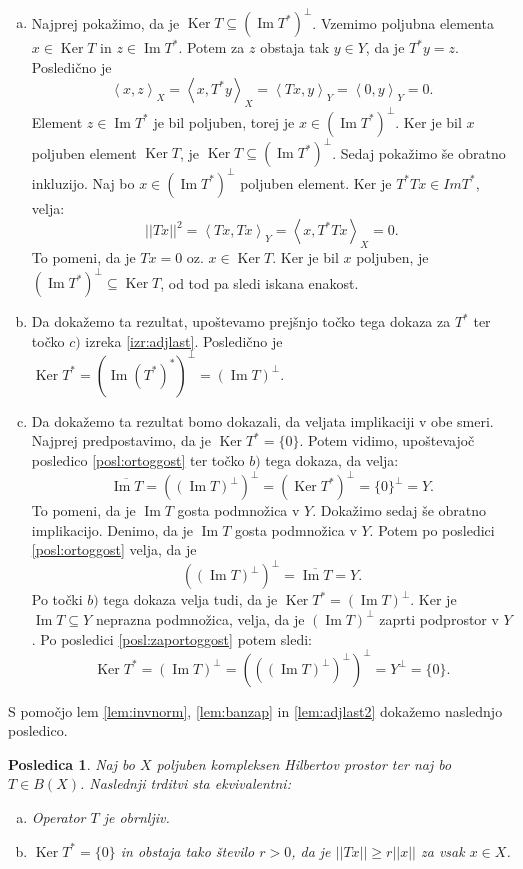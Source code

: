 \documentclass[12pt,a4paper,oneside,fleqn,openany]{book}
\newtheorem{posledica}[izrek]{Posledica}
\newcommand{\eopf}{\raisebox{0.8ex}{\framebox{}}} %
\newenvironment{dokaz}%
{\noindent{\bf Dokaz.}\ }%
{\hfill\eopf\par\bigskip}%
\newcommand{\abs}[1]{\ensuremath{\lvert #1 \rvert}}
\newcommand{\norm}[1]{\abs{\abs{#1}}}
\newcommand{\Sp}[2]{\ensuremath{\left<#1, #2\right>}}
\begin{document}
\begin{dokaz}
	\begin{enumerate}[a)]
		\item Najprej pokažimo, da je $\operatorname{Ker}T \subseteq (\operatorname{Im}T^*)^\bot$. Vzemimo poljubna elementa $x\in \operatorname{Ker}T$ in $z\in \operatorname{Im}T^*$. Potem za $z$ obstaja tak $y\in Y$, da je $T^*y = z$. Posledično je $$\Sp{x}{z}_X = \Sp{x}{T^*y}_X = \Sp{Tx}{y}_Y = \Sp{0}{y}_Y = 0.$$
		Element $z\in\operatorname{Im}T^*$ je bil poljuben, torej je $x\in (\operatorname{Im}T^*)^\bot$. Ker je bil $x$ poljuben element $\operatorname{Ker}T$, je $\operatorname{Ker}T \subseteq (\operatorname{Im}T^*)^\bot$.
		Sedaj pokažimo še obratno inkluzijo. Naj bo $x\in (\operatorname{Im}T^*)^\bot$ poljuben element. Ker je $T^*Tx \in ImT^*$, velja: $$\norm{Tx}^2 = \Sp{Tx}{Tx}_Y = \Sp{x}{T^*Tx}_X= 0.$$
		To pomeni, da je $Tx = 0$ oz. $x\in \operatorname{Ker}T$. Ker je bil $x$ poljuben, je $(\operatorname{Im}T^*)^\bot \subseteq \operatorname{Ker}T$, od tod pa sledi iskana enakost.
		
		\item Da dokažemo ta rezultat, upoštevamo prejšnjo točko tega dokaza za $T^*$ ter točko $c)$ izreka \ref{izr:adjlast}. Posledično je $\operatorname{Ker}T^* = (\operatorname{Im}(T^*)^*)^\bot = (\operatorname{Im}T)^\bot$.
		
		\item Da dokažemo ta rezultat bomo dokazali, da veljata implikaciji v obe smeri.
		Najprej predpostavimo, da je $\operatorname{Ker}T^* = \{0\}$. Potem vidimo, upoštevajoč posledico \ref{posl:ortoggost} ter točko $b)$ tega dokaza, da velja: $$\overline{\operatorname{Im}T} = ((\operatorname{Im}T)^\bot)^\bot = (\operatorname{Ker}T^*)^\bot = \{0\}^\bot = Y.$$ To pomeni, da je $\operatorname{Im}T$ gosta podmnožica v $Y$.
		Dokažimo sedaj še obratno implikacijo. Denimo, da je $\operatorname{Im}T$ gosta podmnožica v $Y$. Potem po posledici \ref{posl:ortoggost} velja, da je $$((\operatorname{Im}T)^{\bot})^\bot = \overline{\operatorname{Im}T} = Y.$$ Po točki $b)$ tega dokaza velja tudi, da je $\operatorname{Ker}T^* = (\operatorname{Im}T)^\bot$. Ker je $\operatorname{Im}T\subseteq Y$ neprazna podmnožica, velja, da je $(\operatorname{Im}T)^\bot$ zaprti podprostor v $Y$. Po posledici \ref{posl:zaportoggost} potem sledi: $$\operatorname{Ker}T^* = (\operatorname{Im}T)^\bot =(((\operatorname{Im}T)^\bot)^\bot)^\bot = Y^\bot = \{0\}.$$
		
	\end{enumerate}
\end{dokaz}
S pomočjo lem \ref{lem:invnorm}, \ref{lem:banzap} in \ref{lem:adjlast2} dokažemo naslednjo posledico.
\begin{posledica}
	\label{posl:adjinv}
	Naj bo $X$ poljuben kompleksen Hilbertov prostor ter naj bo $T\in B(X)$. Naslednji trditvi sta ekvivalentni: \begin{enumerate}[a)]
		\item Operator $T$ je obrnljiv.
		\item $\operatorname{Ker}T^* = \{0\}$ in obstaja tako število $r > 0$, da je $\norm{Tx} \geq r\norm{x}$ za vsak $x\in X$.
	\end{enumerate} 
\end{posledica}
\end{document}
